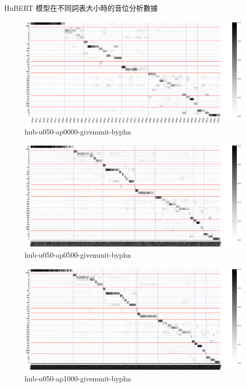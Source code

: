 {{{\begin{table}[!htbp]
\caption{HuBERT 模型在不同詞表大小時的音位分析數據}
    \label{tab:hubert-phn-results}
\end{table}

}  %
{

\begin{figure}
    \centering
    \includegraphics[width=1\linewidth]{feasiblefigs/ch4figs/hub-u050-ap0000-givenunit-byphn.png}
    \caption{hub-u050-ap0000-givenunit-byphn}
    \label{fig:hub-u050-ap0000-givenunit-byphn--detailed}
\end{figure}

\begin{figure}
    \centering
    \includegraphics[width=1\linewidth]{feasiblefigs/ch4figs/hub-u050-ap0500-givenunit-byphn.png}
    \caption{hub-u050-ap0500-givenunit-byphn}
    \label{fig:hub-u050-ap0500-givenunit-byphn--detailed}
\end{figure}

\begin{figure}
    \centering
    \includegraphics[width=1\linewidth]{feasiblefigs/ch4figs/hub-u050-ap1000-givenunit-byphn.png}
    \caption{hub-u050-ap1000-givenunit-byphn}
    \label{fig:hub-u050-ap1000-givenunit-byphn--detailed}
\end{figure}

}}}
